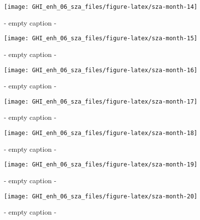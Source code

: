 \documentclass[
  10pt,
  a4paper,oneside]{article}
\begin{document}
\begin{figure}[H]

{\centering \texttt{[image: GHI\_enh\_06\_sza\_files/figure-latex/sza-month-14]} 

}

\caption{ - empty caption - }\label{fig:sza-month-14}
\end{figure}
\begin{figure}[H]

{\centering \texttt{[image: GHI\_enh\_06\_sza\_files/figure-latex/sza-month-15]} 

}

\caption{ - empty caption - }\label{fig:sza-month-15}
\end{figure}
\begin{figure}[H]

{\centering \texttt{[image: GHI\_enh\_06\_sza\_files/figure-latex/sza-month-16]} 

}

\caption{ - empty caption - }\label{fig:sza-month-16}
\end{figure}
\begin{figure}[H]

{\centering \texttt{[image: GHI\_enh\_06\_sza\_files/figure-latex/sza-month-17]} 

}

\caption{ - empty caption - }\label{fig:sza-month-17}
\end{figure}
\begin{figure}[H]

{\centering \texttt{[image: GHI\_enh\_06\_sza\_files/figure-latex/sza-month-18]} 

}

\caption{ - empty caption - }\label{fig:sza-month-18}
\end{figure}
\begin{figure}[H]

{\centering \texttt{[image: GHI\_enh\_06\_sza\_files/figure-latex/sza-month-19]} 

}

\caption{ - empty caption - }\label{fig:sza-month-19}
\end{figure}
\begin{figure}[H]

{\centering \texttt{[image: GHI\_enh\_06\_sza\_files/figure-latex/sza-month-20]} 

}

\caption{ - empty caption - }\label{fig:sza-month-20}
\end{figure}
\end{document}
